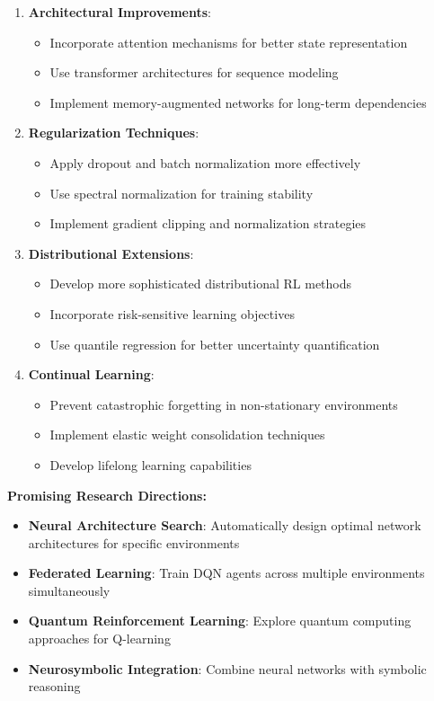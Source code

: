 \documentclass[12pt]{article}
\begin{document}
{{{\begin{enumerate}
    \item \textbf{Architectural Improvements}:
    \begin{itemize}
        \item Incorporate attention mechanisms for better state representation
        \item Use transformer architectures for sequence modeling
        \item Implement memory-augmented networks for long-term dependencies
    \end{itemize}
    
    \item \textbf{Regularization Techniques}:
    \begin{itemize}
        \item Apply dropout and batch normalization more effectively
        \item Use spectral normalization for training stability
        \item Implement gradient clipping and normalization strategies
    \end{itemize}
    
    \item \textbf{Distributional Extensions}:
    \begin{itemize}
        \item Develop more sophisticated distributional RL methods
        \item Incorporate risk-sensitive learning objectives
        \item Use quantile regression for better uncertainty quantification
    \end{itemize}
    
    \item \textbf{Continual Learning}:
    \begin{itemize}
        \item Prevent catastrophic forgetting in non-stationary environments
        \item Implement elastic weight consolidation techniques
        \item Develop lifelong learning capabilities
    \end{itemize}
\end{enumerate}

\textbf{Promising Research Directions:}
\begin{itemize}
    \item \textbf{Neural Architecture Search}: Automatically design optimal network architectures for specific environments
    \item \textbf{Federated Learning}: Train DQN agents across multiple environments simultaneously
    \item \textbf{Quantum Reinforcement Learning}: Explore quantum computing approaches for Q-learning
    \item \textbf{Neurosymbolic Integration}: Combine neural networks with symbolic reasoning
\end{itemize}



}}}
\end{document}
